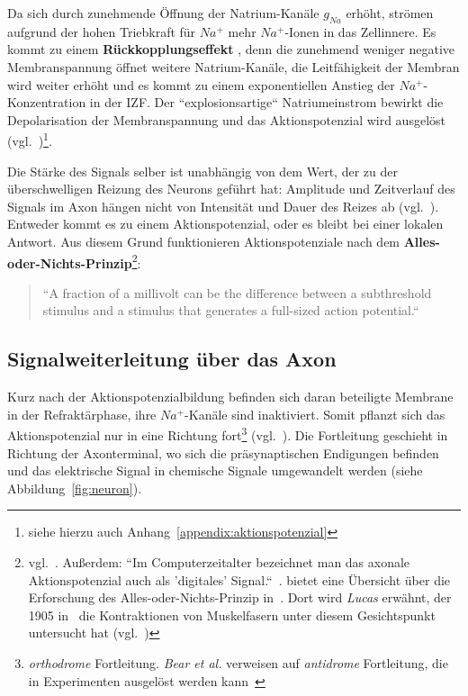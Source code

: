 {Da sich durch zunehmende Öffnung der Natrium-Kanäle $g_{Na}$ erhöht, strömen aufgrund der hohen Triebkraft für $Na^+$ mehr $Na^+$-Ionen in das Zellinnere. Es kommt zu einem \textbf{Rückkopplungseffekt} , denn die zunehmend weniger negative Membranspannung öffnet weitere Natrium-Kanäle, die Leitfähigkeit der Membran wird weiter erhöht und es kommt zu einem exponentiellen Anstieg der $Na^+$-Konzentration in der IZF. Der ``explosionsartige`` Natriumeinstrom bewirkt die Depolarisation der Membranspannung und das Aktionspotenzial wird ausgelöst (vgl.~\cite[69]{FE19})\footnote{
siehe hierzu auch Anhang~\ref{appendix:aktionspotenzial}
}.

Die Stärke des Signals selber ist unabhängig von dem Wert, der zu der überschwelligen Reizung des Neurons geführt hat: Amplitude und Zeitverlauf des Signals im Axon hängen nicht von Intensität und Dauer des Reizes ab (vgl.~\cite[75]{Jon19}). Entweder kommt es zu einem Aktionspotenzial, oder es bleibt bei einer lokalen Antwort. Aus diesem Grund funktionieren Aktionspotenziale nach dem \textbf{Alles-oder-Nichts-Prinzip}\footnote{vgl.~\cite[89]{BCP18}. Außerdem:
 ``Im Computerzeitalter bezeichnet man das axonale Aktionspotenzial auch als 'digitales' Signal.``~\cite[75]{Jon19}.  bietet eine Übersicht über die Erforschung des Alles-oder-Nichts-Prinzip in~\cite{Fra94}. Dort wird \textit{Lucas} erwähnt, der 1905 in~\cite{Luc05} die Kontraktionen von Muskelfasern unter diesem Gesichtspunkt untersucht hat (vgl.~\cite[210]{Fra94})
}:

\blockquote[{\cite[157]{KSJ+13}}]{
 ``A fraction of a millivolt can be the difference between a subthreshold stimulus and a stimulus that generates a full-sized action potential.``
}

\subsection{Signalweiterleitung über das Axon}

Kurz nach der Aktionspotenzialbildung befinden sich daran beteiligte Membrane in der Refraktärphase, ihre $Na^+$-Kanäle sind inaktiviert. 
Somit pflanzt sich das Aktionspotenzial nur in eine Richtung fort\footnote{\textit{orthodrome} Fortleitung.
  \textit{Bear et al.} verweisen auf \textit{antidrome} Fortleitung, die in Experimenten ausgelöst werden kann~\cite[106]{BCP18}
} (vgl.~\cite[106]{BCP18}).
Die Fortleitung geschieht in Richtung der Axonterminal, wo sich die präsynaptischen Endigungen befinden und das elektrische Signal in chemische Signale umgewandelt werden (siehe Abbildung~\ref{fig:neuron}).


}
